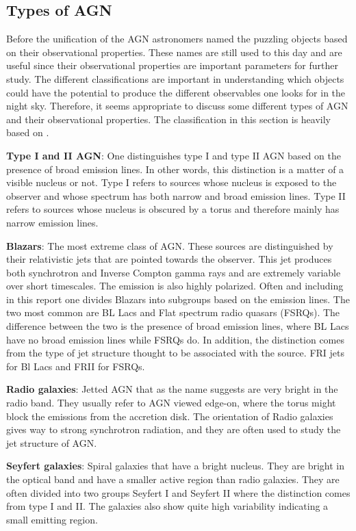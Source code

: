 \subsection{Types of AGN}

Before the unification of the AGN astronomers named the puzzling objects based on their observational properties. These 
names are still used to this day and are useful since their observational properties are important parameters for further study. 
The different classifications are important in understanding which objects could have the potential to produce the different observables one 
looks for in the night sky. Therefore, it seems appropriate to
discuss some different types of AGN and their observational properties. The classification in this section is heavily based on \cite{Astrobites}.

\textbf{Type I and II AGN}:
One distinguishes type I and type II AGN based on the presence of broad emission lines. In other words, this distinction is
a matter of a visible nucleus or not. Type I refers to sources whose nucleus is exposed to the observer and whose spectrum
has both narrow and broad emission lines. Type II refers to sources whose nucleus is obscured by a torus and therefore mainly has narrow emission lines.

\textbf{Blazars}:
The most extreme class of AGN. These sources are distinguished by their relativistic jets that are pointed towards the observer. 
This jet produces both synchrotron and Inverse Compton gamma rays and are extremely variable over short timescales. The
emission is also highly polarized. Often and including in this report one divides Blazars into subgroups based on the 
emission lines. The two most common are BL Lacs and Flat spectrum radio quasars (FSRQs). The difference between the two is the
presence of broad emission lines, where BL Lacs have no broad emission lines while FSRQs do. 
In addition, the distinction comes from the type of jet structure thought to be associated with the source. FRI jets for Bl Lacs and FRII for FSRQs. 

\textbf{Radio galaxies}:
Jetted AGN that as the name suggests are very bright in the radio band. They usually refer to AGN viewed edge-on, where the
torus might block the emissions from the accretion disk. The orientation of Radio galaxies gives way to strong 
synchrotron radiation, and they are often used to study the jet structure of AGN.

\textbf{Seyfert galaxies}:
Spiral galaxies that have a bright nucleus. They are bright in the optical band and have a smaller active region 
than radio galaxies. They are often divided into two groups Seyfert I and Seyfert II where the distinction comes from type I and II. 
The galaxies also show quite high variability indicating a small emitting region. 

